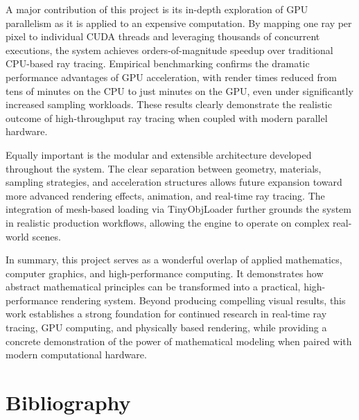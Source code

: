\documentclass[11pt]{article}
\begin{document}
A major contribution of this project is its in-depth exploration of GPU parallelism as it is applied to an expensive computation. By mapping one ray per pixel to individual CUDA threads and leveraging thousands of concurrent executions, the system achieves orders-of-magnitude speedup over traditional CPU-based ray tracing. Empirical benchmarking confirms the dramatic performance advantages of GPU acceleration, with render times reduced from tens of minutes on the CPU to just minutes on the GPU, even under significantly increased sampling workloads. These results clearly demonstrate the realistic outcome of high-throughput ray tracing when coupled with modern parallel hardware.

Equally important is the modular and extensible architecture developed throughout the system. The clear separation between geometry, materials, sampling strategies, and acceleration structures allows future expansion toward more advanced rendering effects, animation, and real-time ray tracing. The integration of mesh-based loading via TinyObjLoader further grounds the system in realistic production workflows, allowing the engine to operate on complex real-world scenes.

In summary, this project serves as a wonderful overlap of applied mathematics, computer graphics, and high-performance computing. It demonstrates how abstract mathematical principles can be transformed into a practical, high-performance rendering system. Beyond producing compelling visual results, this work establishes a strong foundation for continued research in real-time ray tracing, GPU computing, and physically based rendering, while providing a concrete demonstration of the power of mathematical modeling when paired with modern computational hardware.


\section{Bibliography}
\end{document}
